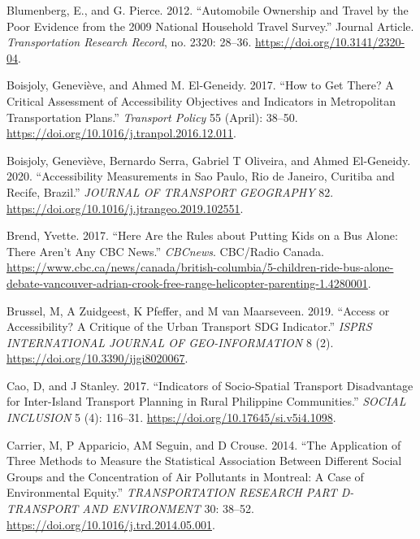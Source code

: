 \documentclass[12pt, oneside]{report}
\newlength{\cslhangindent}
\newlength{\cslentryspacingunit} %
\newenvironment{CSLReferences}[2] %
 {%
  \setlength{\parindent}{0pt}
  \ifodd #1
  \let\oldpar\par
  \def\par{\hangindent=\cslhangindent\oldpar}
  \fi
  \setlength{\parskip}{#2\cslentryspacingunit}
 }%
 {}
\begin{document}
\begin{CSLReferences}{1}{0}
\leavevmode{}%
Blumenberg, E., and G. Pierce. 2012. {``Automobile Ownership and Travel
by the Poor Evidence from the 2009 National Household Travel Survey.''}
Journal Article. \emph{Transportation Research Record}, no. 2320:
28--36. \url{https://doi.org/10.3141/2320-04}.

\leavevmode{}%
Boisjoly, Geneviève, and Ahmed M. El-Geneidy. 2017. {``How to Get There?
{A} Critical Assessment of Accessibility Objectives and Indicators in
Metropolitan Transportation Plans.''} \emph{Transport Policy} 55
(April): 38--50. \url{https://doi.org/10.1016/j.tranpol.2016.12.011}.

\leavevmode{}%
Boisjoly, Geneviève, Bernardo Serra, Gabriel T Oliveira, and Ahmed
El-Geneidy. 2020. {``Accessibility Measurements in {Sao Paulo}, {Rio} de
{Janeiro}, {Curitiba} and {Recife}, {Brazil}.''} \emph{JOURNAL OF
TRANSPORT GEOGRAPHY} 82.
\url{https://doi.org/10.1016/j.jtrangeo.2019.102551}.

\leavevmode{}%
Brend, Yvette. 2017. {``Here Are the Rules about Putting Kids on a Bus
Alone: There Aren't Any \textbar{} CBC News.''} \emph{CBCnews}.
CBC/Radio Canada.
\url{https://www.cbc.ca/news/canada/british-columbia/5-children-ride-bus-alone-debate-vancouver-adrian-crook-free-range-helicopter-parenting-1.4280001}.

\leavevmode{}%
Brussel, M, A Zuidgeest, K Pfeffer, and M van Maarseveen. 2019.
{``Access or {Accessibility}? {A Critique} of the {Urban Transport SDG
Indicator}.''} \emph{ISPRS INTERNATIONAL JOURNAL OF GEO-INFORMATION} 8
(2). \url{https://doi.org/10.3390/ijgi8020067}.

\leavevmode{}%
Cao, D, and J Stanley. 2017. {``Indicators of {Socio-Spatial Transport
Disadvantage} for {Inter-Island Transport Planning} in {Rural Philippine
Communities}.''} \emph{SOCIAL INCLUSION} 5 (4): 116--31.
\url{https://doi.org/10.17645/si.v5i4.1098}.

\leavevmode{}%
Carrier, M, P Apparicio, AM Seguin, and D Crouse. 2014. {``The
Application of Three Methods to Measure the Statistical Association
Between Different Social Groups and the Concentration of Air Pollutants
in {Montreal}: {A} Case of Environmental Equity.''} \emph{TRANSPORTATION
RESEARCH PART D-TRANSPORT AND ENVIRONMENT} 30: 38--52.
\url{https://doi.org/10.1016/j.trd.2014.05.001}.


\end{CSLReferences}
\end{document}
